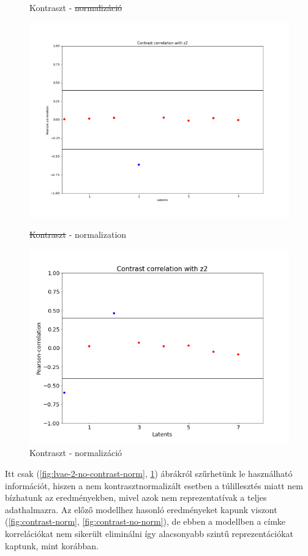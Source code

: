 \documentclass[12pt, english]{article}
\begin{document}
\begin{figure}[H]
\begin{minipage}{0.5\linewidth}
    \caption{Kontraszt - \st{normalizáció}} 
    \label{fig:lvae-2-contrast-no-norm}
  \end{minipage} 
  \begin{minipage}{0.5\linewidth}
    \centering
    \includegraphics[width=.72\linewidth]{lvae2/18_DenseLadderVAE_contrastNorm-contrast-to-z2-corr.png} 
    \caption{\st{Kontraszt} - normalization} 
    \label{fig:lvae-2-no-contrast-norm}
  \end{minipage}%
  \begin{minipage}{0.5\linewidth}
    \centering
    \includegraphics[width=.72\linewidth]{lvae2/19_DenseLadderVAE_contrastNorm_contrast-contrast-to-z2-corr.png} 
    \caption{Kontraszt - normalizáció} 
    \label{fig:lave-2-contrast-norm}
  \end{minipage} 
\end{figure}

\vspace{4mm}

\par Itt csak (\ref{fig:lvae-2-no-contrast-norm}, \ref{fig:lave-2-contrast-norm}) ábrákról szűrhetünk le használható információt, hiszen a nem kontrasztnormalizált esetben a túlillesztés miatt nem bízhatunk az eredményekben, mivel azok nem reprezentatívak a teljes adathalmazra. Az előző modellhez hasonló eredményeket kapunk viszont (\ref{fig:contrast-norm}, \ref{fig:contrast-no-norm}), de ebben a modellben a címke korrelációkat nem sikerült eliminálni így alacsonyabb szintű reprezentációkat kaptunk, mint korábban.
\end{document}
